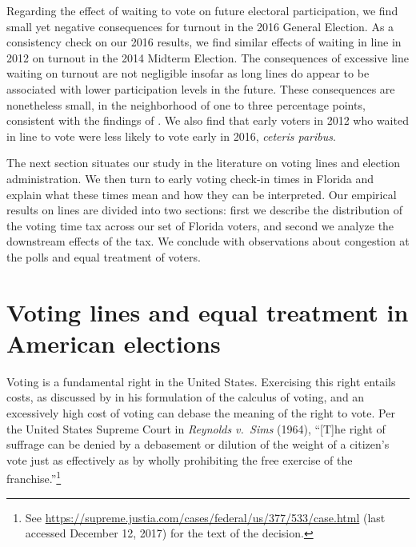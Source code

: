 \documentclass[12pt,titlepage]{article}
\begin{document}

Regarding the effect of waiting to vote on future electoral
participation, we find small yet negative consequences for turnout in
the 2016 General Election.  As a consistency check on our 2016
results, we find similar effects of waiting in line in 2012 on turnout
in the 2014 Midterm Election.  The consequences of excessive line
waiting on turnout are not negligible insofar as long lines do appear
to be associated with lower participation levels in the future.  These
consequences are nonetheless small, in the neighborhood of one to
three percentage points, consistent with the findings of
\citet{pettigrew:longlinesminorityprecincts}.  We also find that early
voters in 2012 who waited in line to vote were less likely to vote
early in 2016, \emph{ceteris paribus}.

The next section situates our study in the literature on voting lines
and election administration.  We then turn to early voting check-in
times in Florida and explain what these times mean and how they can be
interpreted.  Our empirical results on lines are divided into two
sections: first we describe the distribution of the voting time tax
across our set of Florida voters, and second we analyze the downstream
effects of the tax.  We conclude with observations about congestion at
the polls and equal treatment of voters.

\section*{Voting lines and equal treatment in American elections}

Voting is a fundamental right in the United States.  Exercising this
right entails costs, as discussed by \cite{downs:econtheory} in his
formulation of the calculus of voting, and an excessively high cost of
voting can debase the meaning of the right to vote.  Per the United
States Supreme Court in \emph{Reynolds v.\ Sims} (1964), ``[T]he right
of suffrage can be denied by a debasement or dilution of the weight of
a citizen's vote just as effectively as by wholly prohibiting the free
exercise of the franchise.''\footnote{See
  \url{https://supreme.justia.com/cases/federal/us/377/533/case.html}
  (last accessed December 12, 2017) for the text of the decision.}
\end{document}
